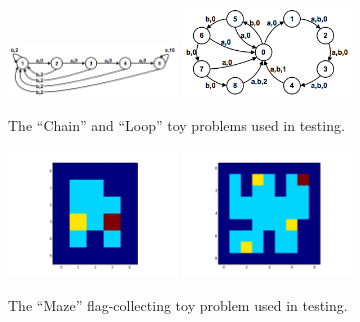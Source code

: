 \documentclass[10pt, twoside]{article}
\begin{document}
\begin{figure}
\centering
\includegraphics[width=0.4\textwidth]{chain.png}
\includegraphics[width=0.4\textwidth]{loop.png}
\caption{\label{fig:chainloop} The ``Chain'' and ``Loop'' toy problems used in testing.}
\end{figure}

\begin{figure}
\centering
\includegraphics[width=0.4\textwidth]{easymaze.png}
\includegraphics[width=0.4\textwidth]{hardmaze.png}
\caption{\label{fig:maze} The ``Maze'' flag-collecting toy problem used in testing.
}
\end{figure}



\end{document}
